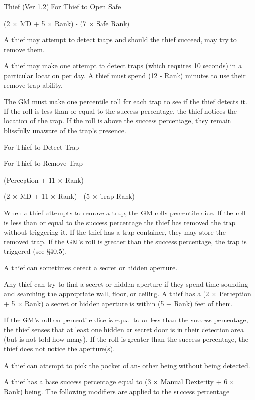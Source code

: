 \begin{Chapter}{Thief (Ver 1.2)}
For Thief to 
Open Safe 

(2 × MD + 5 × Rank)  - (7 × 
Safe Rank) 

A  thief  may  attempt  to  detect  traps  and  should 
the thief succeed, may try to remove them. 

A  thief  may  make  one  attempt  to  detect  traps 
(which requires 10 seconds) in a particular location 
per day. A thief must spend (12 - Rank) minutes to 
use their remove trap ability. 

The  GM  must  make  one  percentile  roll  for  each 
trap  to  see  if  the  thief  detects  it.  If  the  roll  is  less 
than  or  equal  to  the  success  percentage,  the  thief 
notices the location of the trap. If the roll is above 
the  success  percentage,  they  remain  blissfully 
unaware of the trap’s presence. 

For Thief to 
Detect Trap  

For Thief to 
Remove Trap  

(Perception + 11 × Rank) 

(2 × MD + 11 × Rank)  - (5 
× Trap Rank) 

When  a  thief  attempts  to  remove  a  trap,  the  GM 
rolls percentile dice. If the roll is less than or equal 
to the success percentage the thief has removed the 
trap  without  triggering  it.  If  the  thief  has  a  trap 
container,  they  may  store  the  removed  trap.  If  the 
GM’s  roll  is  greater  than  the  success  percentage, 
the trap is triggered (see §40.5). 

A thief can sometimes detect a secret or hidden 
aperture. 

Any thief can try to find a secret or hidden aperture 
if  they  spend  time  sounding  and  searching  the 
appropriate wall, floor, or ceiling.  A  thief has a (2 
× Perception + 5 × Rank)%
a secret or hidden aperture is within (5 + Rank) feet 
of them. 

If  the  GM’s  roll  on  percentile  dice  is  equal  to  or 
less  than  the  success  percentage,  the  thief  senses 
that  at  least  one  hidden  or  secret  door  is  in  their 
detection  area  (but  is  not  told  how  many).  If  the 
roll is greater than the success percentage, the thief 
does not notice the aperture(s). 

A  thief  can  attempt  to  pick  the  pocket  of  an-
other being without being detected. 

A thief has a base success percentage equal to (3 × 
Manual  Dexterity  +  6  ×  Rank)%
being.  The  following  modifiers  are  applied  to  the 
success percentage: 


\end{Chapter}
